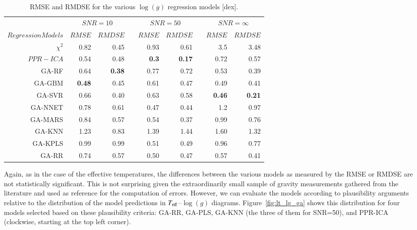 \begin{table}\centering
\begin{tabular}{@{}rrrcrrcrr@{}}\toprule
& \multicolumn{2}{c}{$SNR = 10$} & \phantom{ab}& \multicolumn{2}{c}{$SNR = 50$} &
\phantom{ab} & \multicolumn{2}{c}{$SNR = \infty$}\\
\cmidrule{2-3} \cmidrule{5-6} \cmidrule{8-9}
$Regression Models$ & $RMSE$ & $RMDSE$ && $RMSE$ & $RMDSE$     && $RMSE$       & $RMDSE$ \\ \midrule
$\chi^2$          & 0.82       & 0.45      && 0.93       & 0.61       && 3.5        & 3.48 \\
$ PPR-ICA$        & 0.54       & 0.48      && {\bf 0.3}  & {\bf 0.17} && 0.72       & 0.57 \\
GA-RF             & 0.64       & \bf{0.38} && 0.77       & 0.72       && 0.53       & 0.39 \\
GA-GBM            & {\bf 0.48} & 0.45      && 0.61       & 0.47       && 0.49       & 0.41 \\
GA-SVR            & 0.66       & 0.40      && 0.63       & 0.58       && {\bf 0.46} & \bf{0.21} \\
GA-NNET           & 0.78       & 0.61      && 0.47       & 0.44       && 1.2        & 0.97 \\
GA-MARS           & 0.84       & 0.57      && 0.54       & 0.37       && 0.99       & 0.76 \\
GA-KNN            & 1.23       & 0.83      && 1.39       & 1.44       && 1.60       & 1.32 \\
GA-KPLS           & 0.99       & 0.99      && 0.51       & 0.49       && 0.96       & 0.77 \\
GA-RR             & 0.74       & 0.57      && 0.50       & 0.47       && 0.57       & 0.41 \\

\bottomrule
\end{tabular}
\caption {RMSE and RMDSE for the various $\log(g)$ regression models
  [dex].}
\label{tab:models_G_rmse} 
\end{table}

Again, as in the case of the effective temperatures, the differences
between the various models as measured by the RMSE or RMDSE are not
statistically significant.  This is not surprising given the
extraordinarily small sample of gravity measurements gathered from the
literature and used as reference for the computation of errors.
However, we can evaluate the models according to plausibility
arguments relative to the distribution of the model predictions in
$T_{\rm eff}$--$\log(g)$ diagrams.  Figure~\ref{fig:lt_lg_ga} shows
this distribution for four models selected based on these plausibility
criteria: GA-RR, GA-PLS, GA-KNN (the three of them for SNR=50), and
PPR-ICA (clockwise, starting at the top left corner).

